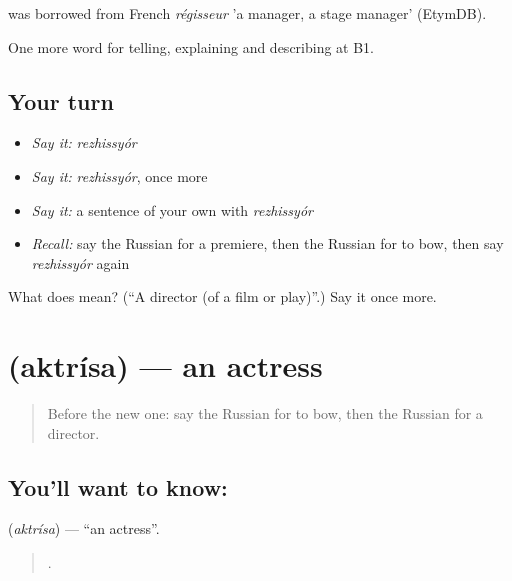 \begin{cousinweb}
\emph{} was borrowed from French \emph{régisseur} 'a manager, a stage manager' (EtymDB).
\end{cousinweb}

\begin{grammarlens}[title={What you've built}]
One more word for telling, explaining and describing at B1.
\end{grammarlens}

\subsection*{Your turn}
\begin{itemize}
\raggedright
  \item \emph{Say it:} \emph{rezhissyór}
  \item \emph{Say it:} \emph{rezhissyór}, once more
  \item \emph{Say it:} a sentence of your own with \emph{rezhissyór}
  \item \emph{Recall:} say the Russian for a premiere, then the Russian for to bow, then say \emph{rezhissyór} again
\end{itemize}

\begin{tcolorbox}[breakable,colback=teal!4,colframe=teal!35!black,title={Before you move on}]
What does  mean? (\textquotedblleft{}A director (of a film or play)\textquotedblright{}.) Say it once more.
\end{tcolorbox}
\section[\texorpdfstring{\ru{актриса} (aktrísa)}{актриса (aktrísa)}]{ (aktrísa) — an actress}

\label{lesson:RU-C520-aktrisa}



\begin{quote}
Before the new one: say the Russian for to bow, then the Russian for a director.
\end{quote}

\subsection*{You'll want to know: }
\textbf{} (\emph{aktrísa}) — \textquotedblleft{}an actress\textquotedblright{}.

\begin{quote}
     .
\end{quote}

